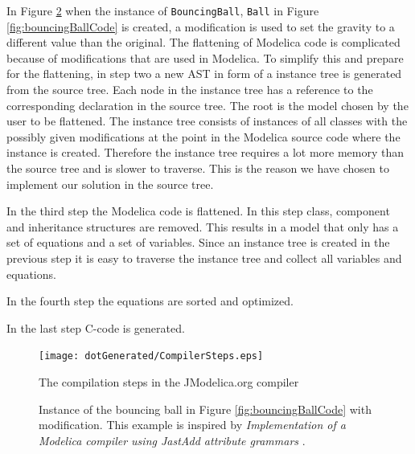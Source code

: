 \documentclass{cslthse-msc}
\begin{document}
In Figure \ref{fig:bouncingBallInstance} when the instance of \texttt{BouncingBall}, \texttt{Ball} in Figure \ref{fig:bouncingBallCode} is created, a modification is used to set the gravity to a different value than the original. The flattening of Modelica code is complicated because of modifications that are used in Modelica. To simplify this and  prepare for the flattening, in step two a new AST in form of a instance tree is generated from the source tree. Each node in the instance tree has a reference to the corresponding declaration in the source tree. The root is the model chosen by the user to be flattened. The instance tree consists of instances of all classes with the possibly given modifications at the point in the Modelica source code where the instance is created. Therefore the instance tree requires a lot more memory than the source tree and is slower to traverse. This is the reason we have chosen to implement our solution in the source tree. 

In the third step the Modelica code is flattened. In this step class, component and inheritance structures are removed. This results in a model that only has a set of equations and a set of variables. Since an instance tree is created in the previous step it is easy to traverse the instance tree and collect all variables and equations.

In the fourth step the equations are sorted and optimized.

In the last step C-code is generated.

\begin{figure}[!htbp]
    \centering
    {\texttt{[image: dotGenerated/CompilerSteps.eps]}}
    \caption{The compilation steps in the JModelica.org compiler}
    \label{fig:compilerSteps}
\end{figure}

\begin{figure}[!htbp]
    \centering
    
    \caption{Instance of the bouncing ball in Figure \ref{fig:bouncingBallCode} with modification. This example is inspired by \textit{Implementation of a Modelica compiler using JastAdd attribute grammars} \cite{aakesson2010implementation}.}
    \label{fig:bouncingBallInstance}
\end{figure}
\end{document}
